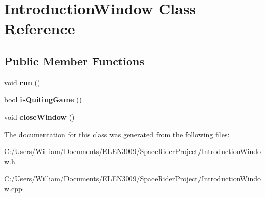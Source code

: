 \hypertarget{class_introduction_window}{}\section{Introduction\+Window Class Reference}
\label{class_introduction_window}
\subsection*{Public Member Functions}
\begin{DoxyCompactItemize}
\item 
\mbox{\label{class_introduction_window_a18d9a74bc2c18827a8e45758b148f8d7}} 
void {\bfseries run} ()
\item 
\mbox{\label{class_introduction_window_a1d4874be8dcba17d58ba82a848829390}} 
bool {\bfseries is\+Quiting\+Game} ()
\item 
\mbox{\label{class_introduction_window_ac3a87ad4e554621ecd2e374933fbe89d}} 
void {\bfseries close\+Window} ()
\end{DoxyCompactItemize}


The documentation for this class was generated from the following files\+:\begin{DoxyCompactItemize}
\item 
C\+:/\+Users/\+William/\+Documents/\+E\+L\+E\+N3009/\+Space\+Rider\+Project/Introduction\+Window.\+h\item 
C\+:/\+Users/\+William/\+Documents/\+E\+L\+E\+N3009/\+Space\+Rider\+Project/Introduction\+Window.\+cpp\end{DoxyCompactItemize}
